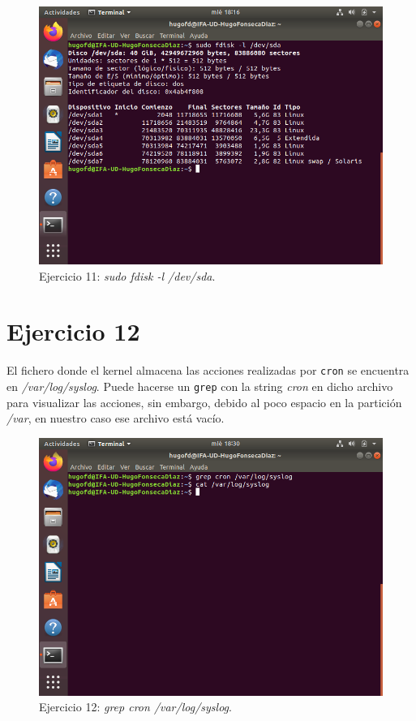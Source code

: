 \documentclass[11pt]{article}
\begin{document}
\begin{figure}[H]
    \caption{Ejercicio 11: \textit{sudo fdisk -l /dev/sda}.}
  \centering
  \includegraphics[scale=0.7]{e11.png}
\end{figure}

\section{Ejercicio 12}
El fichero donde el kernel almacena las acciones realizadas por \verb|cron| se encuentra en \textit{/var/log/syslog}. Puede hacerse un \verb|grep| con la string \textit{cron} en dicho archivo para visualizar las acciones, sin embargo, debido al poco espacio en la partición \textit{/var}, en nuestro caso ese archivo está vacío.

\begin{figure}[H]
    \caption{Ejercicio 12: \textit{grep cron /var/log/syslog}.}
  \centering
  \includegraphics[scale=0.7]{e12.png}
\end{figure}
\end{document}
